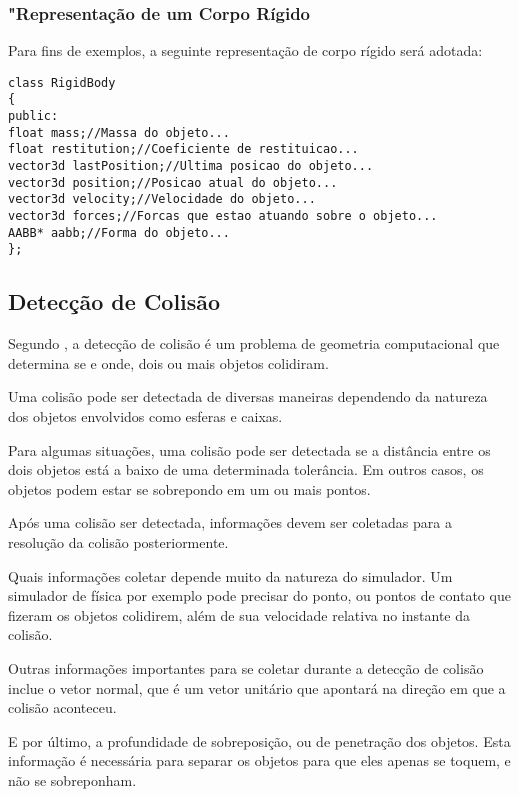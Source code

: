 \subsubsection{"Representação de um Corpo Rígido}

Para fins de exemplos, a seguinte representação de corpo rígido será adotada:

\begin{lstlisting}[frame=single,caption=Exemplo de corpo rígido\label{code:RigidBody}]
class RigidBody
{
public:
float mass;//Massa do objeto...
float restitution;//Coeficiente de restituicao...
vector3d lastPosition;//Ultima posicao do objeto...
vector3d position;//Posicao atual do objeto...
vector3d velocity;//Velocidade do objeto...
vector3d forces;//Forcas que estao atuando sobre o objeto...
AABB* aabb;//Forma do objeto...
};
\end{lstlisting}

\subsection{Detecção de Colisão}
Segundo , a detecção de colisão é um problema de geometria computacional que
determina se e onde, dois ou mais objetos colidiram.

Uma colisão pode ser detectada de diversas maneiras dependendo da natureza dos
objetos envolvidos como esferas e caixas.

Para algumas situações, uma colisão
pode ser detectada se a distância entre os dois objetos está a baixo de uma
determinada tolerância. Em outros casos, os objetos podem estar se sobrepondo
em um ou mais pontos.

Após uma colisão ser detectada, informações devem ser coletadas para a
resolução da colisão posteriormente.

Quais informações coletar depende muito da natureza do simulador. Um simulador
de física por exemplo pode precisar do ponto, ou pontos de contato que fizeram
os objetos colidirem, além de sua velocidade relativa no instante da colisão.


Outras informações importantes para se coletar durante a detecção de colisão
inclue o vetor normal, que é um vetor unitário que apontará na direção em que a
colisão aconteceu.


E por último, a profundidade de sobreposição, ou de penetração dos objetos.
Esta informação é necessária para separar os objetos para que eles apenas se
toquem, e não se sobreponham.


